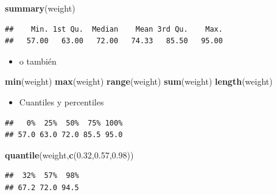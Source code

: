 \documentclass[]{article}
\def\tightlist{}
\newenvironment{Shaded}{\begin{snugshade}}{\end{snugshade}}
\newcommand{\KeywordTok}[1]{\textcolor[rgb]{0.13,0.29,0.53}{\textbf{{#1}}}}
\newcommand{\FloatTok}[1]{\textcolor[rgb]{0.00,0.00,0.81}{{#1}}}
\newcommand{\CommentTok}[1]{\textcolor[rgb]{0.56,0.35,0.01}{\textit{{#1}}}}
\newcommand{\NormalTok}[1]{{#1}}
\numberwithin{equation}{section}
\begin{document}
\begin{Shaded}
\begin{Highlighting}[]
\KeywordTok{summary}\NormalTok{(weight)}
\end{Highlighting}
\end{Shaded}

\begin{verbatim}
##    Min. 1st Qu.  Median    Mean 3rd Qu.    Max. 
##   57.00   63.00   72.00   74.33   85.50   95.00
\end{verbatim}

\begin{itemize}
\tightlist
\item
  o también
\end{itemize}

\begin{Shaded}
\begin{Highlighting}[]
\KeywordTok{min}\NormalTok{(weight)}
\KeywordTok{max}\NormalTok{(weight)}
\KeywordTok{range}\NormalTok{(weight)}
\KeywordTok{sum}\NormalTok{(weight)}
\KeywordTok{length}\NormalTok{(weight)}
\end{Highlighting}
\end{Shaded}

\begin{itemize}
\tightlist
\item
  Cuantiles y percentiles
\end{itemize}

\begin{Shaded}
\end{Shaded}

\begin{verbatim}
##   0%  25%  50%  75% 100% 
## 57.0 63.0 72.0 85.5 95.0
\end{verbatim}

\begin{Shaded}
\begin{Highlighting}[]
\KeywordTok{quantile}\NormalTok{(weight,}\KeywordTok{c}\NormalTok{(}\FloatTok{0.32}\NormalTok{,}\FloatTok{0.57}\NormalTok{,}\FloatTok{0.98}\NormalTok{))}
\end{Highlighting}
\end{Shaded}

\begin{verbatim}
##  32%  57%  98% 
## 67.2 72.0 94.5
\end{verbatim}
\end{document}
